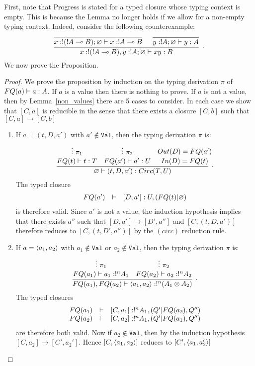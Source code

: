 \documentclass{article}
\begin{document}
First, note that Progress is stated for a typed closure whose typing 
context is empty. This is because the Lemma no longer holds if we allow 
for a non-empty typing context. Indeed, consider the following counterexample:
\[
\infer[.]{x:!(!A\loli B), y:!A;\varnothing\entails xy:B}{
 \infer[]{x:!(!A\loli B);\varnothing\entails x:!A\loli B}{ 
 }
 &
 \infer[]{y:!A;\varnothing\entails y:A}{ 
 }
}
\]
We now prove the Proposition.

\begin{proof}
We prove the proposition by induction on the typing derivation $\pi$ of 
$FQ(a)\vdash a:A$. If $a$ is a value then there is nothing 
to prove. If $a$ is not a value, then by 
Lemma~\hyperref[non_values]{\ref*{non_values}} there are 5 cases to consider. 
In each case we show that $[C,a]$ is reducible in the sense that there exists a 
closure  $[C,b]$ such that $[C,a]\to[C,b]$
\begin{enumerate}
  \item If $a=(t,D,a')$ with $a'\notin \mathtt{Val}$, then the typing derivation 
  $\pi$ is:
  \[
  \infer[.]{\varnothing\entails (t,D,a'):Circ(T,U)}{
    \deduce[]{FQ(t)\entails t:T}{
      \vdots ~\pi_1
    }
    &
    \deduce[]{FQ(a')\entails a':U}{
      \vdots ~\pi_2     
    }
    &
    \deduce[]{In(D)=FQ(t)}{
      Out(D)=FQ(a')
    }
  }   
  \]
  The typed closure 
  \[
  \begin{array}{rcl}
  FQ(a') & \vdash & [D,a']:U,(FQ(t)|\varnothing)
  \end{array}
  \]
  is therefore valid. Since $a'$ 
  is not a value, the induction hypothesis implies that there exists $a''$ such 
  that $[D,a']\to [D',a'']$ and $[C,(t,D,a')]$ therefore reduces to 
  $[C,(t,D',a'')]$ by the $(circ)$ reduction rule.
  \item If $a=\langle a_1,a_2\rangle$ with $a_1\notin \mathtt{Val}$ or $a_2\notin \mathtt{Val}$,
  then the typing derivation $\pi$ is:
  \[
  \infer[.]{FQ(a_1),FQ(a_2)\entails \p{a_1,a_2}:!^n(A_1\x A_2)}{
    \deduce[]{FQ(a_1)\entails a_1:!^nA_1}{
      \vdots~\pi_1
    }
    & 
    \deduce[]{FQ(a_2)\entails a_2:!^nA_2}{
      \vdots~\pi_2
    }
  }
  \] 
  The typed closures 
  \[
  \begin{array}{rcl}
  FQ(a_1) & \vdash & [C,a_1]:!^nA_1,(Q'|FQ(a_2),Q'')\\
  FQ(a_2) & \vdash & [C,a_2]:!^nA_1, (Q'|FQ(a_1),Q'')
  \end{array}
  \]
  are therefore both valid. 
  Now if $a_2\notin\mathtt{Val}$, then by the induction hypothesis 
  $[C,a_2]\to[C',a_2']$. Hence $[C,\langle a_1,a_2\rangle]$ reduces to $[C',\langle a_1,a_2'\rangle]$ 

\end{enumerate}
\end{proof}
\end{document}
